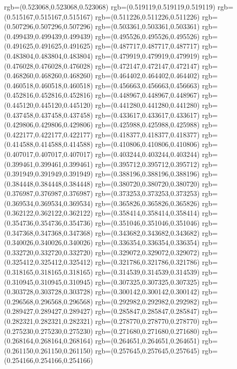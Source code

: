 {{{			rgb=(0.523068,0.523068,0.523068)
			rgb=(0.519119,0.519119,0.519119)
			rgb=(0.515167,0.515167,0.515167)
			rgb=(0.511226,0.511226,0.511226)
			rgb=(0.507296,0.507296,0.507296)
			rgb=(0.503361,0.503361,0.503361)
			rgb=(0.499439,0.499439,0.499439)
			rgb=(0.495526,0.495526,0.495526)
			rgb=(0.491625,0.491625,0.491625)
			rgb=(0.487717,0.487717,0.487717)
			rgb=(0.483804,0.483804,0.483804)
			rgb=(0.479919,0.479919,0.479919)
			rgb=(0.476028,0.476028,0.476028)
			rgb=(0.472147,0.472147,0.472147)
			rgb=(0.468260,0.468260,0.468260)
			rgb=(0.464402,0.464402,0.464402)
			rgb=(0.460518,0.460518,0.460518)
			rgb=(0.456663,0.456663,0.456663)
			rgb=(0.452816,0.452816,0.452816)
			rgb=(0.448967,0.448967,0.448967)
			rgb=(0.445120,0.445120,0.445120)
			rgb=(0.441280,0.441280,0.441280)
			rgb=(0.437458,0.437458,0.437458)
			rgb=(0.433617,0.433617,0.433617)
			rgb=(0.429806,0.429806,0.429806)
			rgb=(0.425988,0.425988,0.425988)
			rgb=(0.422177,0.422177,0.422177)
			rgb=(0.418377,0.418377,0.418377)
			rgb=(0.414588,0.414588,0.414588)
			rgb=(0.410806,0.410806,0.410806)
			rgb=(0.407017,0.407017,0.407017)
			rgb=(0.403244,0.403244,0.403244)
			rgb=(0.399461,0.399461,0.399461)
			rgb=(0.395712,0.395712,0.395712)
			rgb=(0.391949,0.391949,0.391949)
			rgb=(0.388196,0.388196,0.388196)
			rgb=(0.384448,0.384448,0.384448)
			rgb=(0.380720,0.380720,0.380720)
			rgb=(0.376987,0.376987,0.376987)
			rgb=(0.373253,0.373253,0.373253)
			rgb=(0.369534,0.369534,0.369534)
			rgb=(0.365826,0.365826,0.365826)
			rgb=(0.362122,0.362122,0.362122)
			rgb=(0.358414,0.358414,0.358414)
			rgb=(0.354736,0.354736,0.354736)
			rgb=(0.351046,0.351046,0.351046)
			rgb=(0.347368,0.347368,0.347368)
			rgb=(0.343682,0.343682,0.343682)
			rgb=(0.340026,0.340026,0.340026)
			rgb=(0.336354,0.336354,0.336354)
			rgb=(0.332720,0.332720,0.332720)
			rgb=(0.329072,0.329072,0.329072)
			rgb=(0.325412,0.325412,0.325412)
			rgb=(0.321786,0.321786,0.321786)
			rgb=(0.318165,0.318165,0.318165)
			rgb=(0.314539,0.314539,0.314539)
			rgb=(0.310945,0.310945,0.310945)
			rgb=(0.307325,0.307325,0.307325)
			rgb=(0.303728,0.303728,0.303728)
			rgb=(0.300142,0.300142,0.300142)
			rgb=(0.296568,0.296568,0.296568)
			rgb=(0.292982,0.292982,0.292982)
			rgb=(0.289427,0.289427,0.289427)
			rgb=(0.285847,0.285847,0.285847)
			rgb=(0.282321,0.282321,0.282321)
			rgb=(0.278770,0.278770,0.278770)
			rgb=(0.275230,0.275230,0.275230)
			rgb=(0.271680,0.271680,0.271680)
			rgb=(0.268164,0.268164,0.268164)
			rgb=(0.264651,0.264651,0.264651)
			rgb=(0.261150,0.261150,0.261150)
			rgb=(0.257645,0.257645,0.257645)
			rgb=(0.254166,0.254166,0.254166)
}}}
